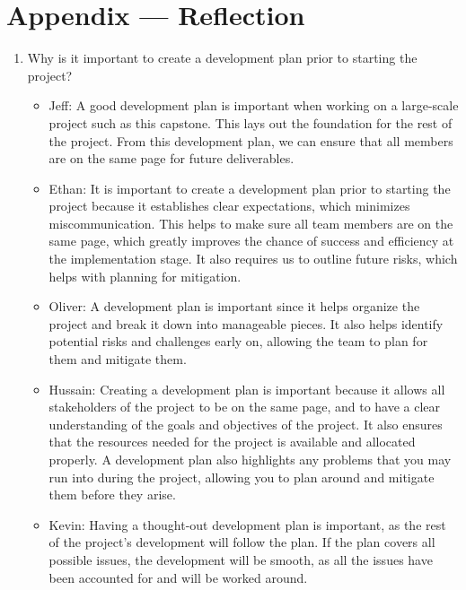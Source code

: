 \documentclass{article}
\begin{document}
{\newpage{}

\section*{Appendix --- Reflection}




\begin{enumerate}
    \item Why is it important to create a development plan prior to starting the
    project?
	\begin{itemize}
		\item Jeff: A good development plan is important when working 
    on a large-scale project such as this capstone. 
    This lays out the foundation for the rest of the project.
    From this development plan, we can ensure that all
    members are on the same page for future deliverables.
    \item Ethan: It is important to create a development plan prior to starting
      the project because it establishes clear expectations, which minimizes
      miscommunication. This helps to make sure all team members are on the
      same page, which greatly improves the chance of success and efficiency at
      the implementation stage. It also requires us to outline future risks,
      which helps with planning for mitigation.
		\item Oliver: A development plan is important since it helps organize 
    the project and break it down into manageable pieces. It also helps 
    identify potential risks and challenges early on, allowing the team 
    to plan for them and mitigate them. 
		\item Hussain: Creating a development plan is important because it 
    allows all stakeholders of the project to be on the same page, 
    and to have a clear understanding of the goals and objectives 
    of the project. It also ensures that the resources needed for 
    the project is available and allocated properly. 
    A development plan also highlights any problems that 
    you may run into during the project, allowing you to plan 
    around and mitigate them before they arise.
		\item Kevin: Having a thought-out development plan is important, as the 
        rest of the project's development will follow the plan. If the plan 
        covers all possible issues, the development will be smooth, as all the 
        issues have been accounted for and will be worked around. 

\end{itemize}
\end{enumerate}}
\end{document}
